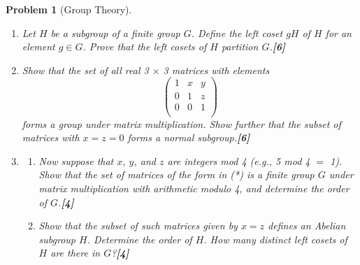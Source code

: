 \documentclass[a4paper]{article}
\theoremstyle{new}
\newtheorem{qns}{Problem}[section]
\begin{document}
\newpage
\begin{qns}[Group Theory]\leavevmode
\begin{enumerate}[label=(\alph*)]
\item Let $H$ be a subgroup of a finite group $G$. Define the left coset $gH$ of $H$ for an element $g\in G$. Prove that the left cosets of $H$ partition $G$.\hfill\textbf{[6]}
\item Show that the set of all real 3 $\times$ 3 matrices with elements
\begin{equation}
    \begin{pmatrix}1&x&y\\0&1&z\\0&0&1\\\end{pmatrix}\tag{*}
\end{equation}
forms a group under matrix multiplication. Show further that the subset of matrices with $x = z = 0$ forms a normal subgroup.\hfill\textbf{[6]}
\item 
\begin{enumerate}[label=(\roman*)]
\item Now suppose that $x$, $y$, and $z$ are integers mod 4 (e.g., 5 mod 4 $=$ 1). Show that the set of matrices of the form in (*) is a finite group $G$ under matrix multiplication with arithmetic modulo 4, and determine the order of $G$.\hfill\textbf{[4]}
\item Show that the subset of such matrices given by $x = z$ defines an Abelian subgroup $H$. Determine the order of $H$. How many distinct left cosets of $H$ are there in $G$?\hfill\textbf{[4]}
\end{enumerate}
\end{enumerate}
\end{qns}
\end{document}
